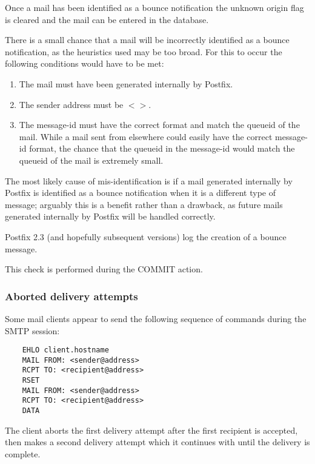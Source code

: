 \documentclass[a4paper,12pt,draft]{article}
\begin{document}
Once a mail has been identified as a bounce notification the unknown origin
flag is cleared and the mail can be entered in the database.

There is a small chance that a mail will be incorrectly identified as a
bounce notification, as the heuristics used may be too broad.  For this to
occur the following conditions would have to be met:

\begin{enumerate}

    \item The mail must have been generated internally by Postfix.

    \item The sender address must be $<>$.

    \item The message-id must have the correct format and match the queueid
        of the mail.  While a mail sent from elsewhere could easily have
        the correct message-id format, the chance that the queueid in the
        message-id would match the queueid of the mail is extremely small.

\end{enumerate}

The most likely cause of mis-identification is if a mail generated
internally by Postfix is identified as a bounce notification when it is a
different type of message; arguably this is a benefit rather than a
drawback, as future mails generated internally by Postfix will be handled
correctly.

Postfix 2.3 (and hopefully subsequent versions) log the creation of a
bounce message.

This check is performed during the COMMIT action.

\subsubsection{Aborted delivery attempts}

\label{aborted-delivery-attempts}

Some mail clients appear to send the following sequence of commands during
the SMTP session:

\begin{verbatim}
    EHLO client.hostname
    MAIL FROM: <sender@address>
    RCPT TO: <recipient@address>
    RSET
    MAIL FROM: <sender@address>
    RCPT TO: <recipient@address>
    DATA
\end{verbatim}

The client aborts the first delivery attempt after the first recipient is
accepted, then makes a second delivery attempt which it continues with
until the delivery is complete.
\end{document}
